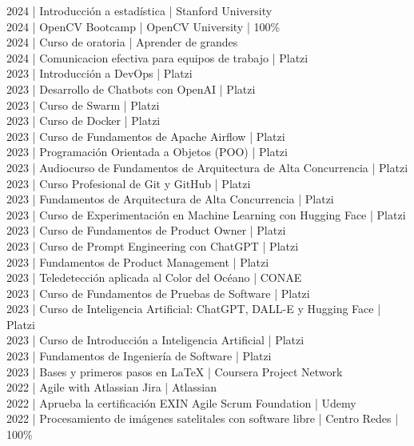 {2024 | Introducción a estadística | Stanford University \\
2024 | OpenCV Bootcamp | OpenCV University | 100\% \\
2024 | Curso de oratoria | Aprender de grandes \\
2024 | Comunicacion efectiva para equipos de trabajo | Platzi \\
2023 | Introducción a DevOps | Platzi \\
2023 | Desarrollo de Chatbots con OpenAI  | Platzi \\
2023 | Curso de Swarm | Platzi \\
2023 | Curso de Docker | Platzi \\
2023 | Curso de Fundamentos de Apache Airflow | Platzi \\
2023 | Programación Orientada a Objetos (POO) | Platzi \\
2023 | Audiocurso de Fundamentos de Arquitectura de Alta Concurrencia | Platzi \\
2023 | Curso Profesional de Git y GitHub | Platzi \\
2023 | Fundamentos de Arquitectura de Alta Concurrencia | Platzi \\
2023 | Curso de Experimentación en Machine Learning con Hugging Face | Platzi \\
2023 | Curso de Fundamentos de Product Owner | Platzi \\
2023 | Curso de Prompt Engineering con ChatGPT | Platzi \\
2023 | Fundamentos de Product Management | Platzi \\
2023 | Teledetección aplicada al Color del Océano | CONAE \\
2023 | Curso de Fundamentos de Pruebas de Software | Platzi \\
2023 | Curso de Inteligencia Artificial: ChatGPT, DALL-E y Hugging Face | Platzi \\
2023 | Curso de Introducción a Inteligencia Artificial | Platzi \\
2023 | Fundamentos de Ingeniería de Software | Platzi \\
2023 | Bases y primeros pasos en LaTeX | Coursera Project Network \\
2022 | Agile with Atlassian Jira | Atlassian \\
2022 | Aprueba la certificación EXIN Agile Scrum Foundation | Udemy \\
2022 | Procesamiento de imágenes satelitales con software libre | Centro Redes | 100\% \\
}
